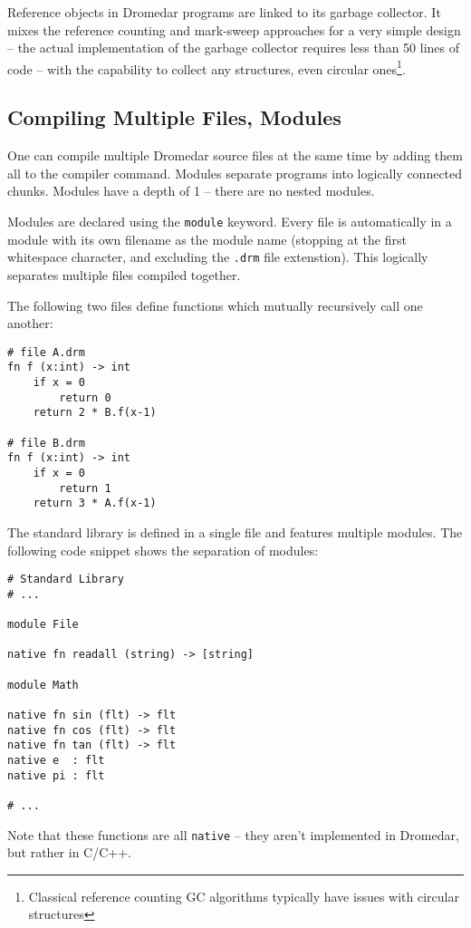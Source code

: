 \documentclass{article}
\newcommand{\code}[1]{\lstinline[columns=fixed]{#1}}
\begin{document}
			Reference objects in Dromedar programs are linked to its garbage collector. It mixes the reference counting and mark-sweep approaches for a very simple design -- the actual implementation of the garbage collector requires less than 50 lines of code -- with the capability to collect any structures, even circular ones\footnote{Classical reference counting GC algorithms typically have issues with circular structures}.
		
		\subsection{Compiling Multiple Files, Modules}
		
			One can compile multiple Dromedar source files at the same time by adding them all to the compiler command. Modules separate programs into logically connected chunks. Modules have a depth of 1 -- there are no nested modules.
			
			Modules are declared using the \code{module} keyword. Every file is automatically in a module with its own filename as the module name (stopping at the first whitespace character, and excluding the \texttt{.drm} file extenstion). This logically separates multiple files compiled together.
			
			The following two files define functions which mutually recursively call one another:
			
			\begin{lstlisting}
# file A.drm
fn f (x:int) -> int
	if x = 0
		return 0
	return 2 * B.f(x-1)

# file B.drm
fn f (x:int) -> int
	if x = 0
		return 1
	return 3 * A.f(x-1)
			\end{lstlisting}
			
			The standard library is defined in a single file and features multiple modules. The following code snippet shows the separation of modules:
			
			\begin{lstlisting}
# Standard Library
# ...			

module File

native fn readall (string) -> [string]

module Math

native fn sin (flt) -> flt
native fn cos (flt) -> flt
native fn tan (flt) -> flt
native e  : flt
native pi : flt

# ...
			\end{lstlisting}
			
			Note that these functions are all \code{native} -- they aren't implemented in Dromedar, but rather in C/C++.
	
\end{document}
